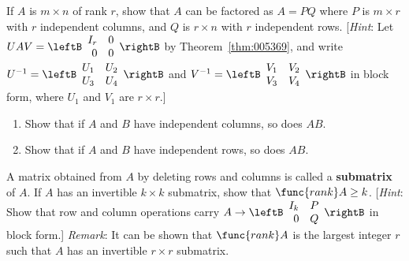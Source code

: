 \begin{multicols}{2}
\begin{ex}
If $A$ is $m \times n$ of rank $r$, show that $A$ can be factored as $A = PQ$ where $P$ is $m \times r$ with $r$ independent columns, and $Q$ is $r \times n$ with $r$ independent rows. [\textit{Hint}: Let 
$UAV = \leftB \begin{array}{rr}
I_r & 0 \\
0 & 0
\end{array} \rightB$ by Theorem~\ref{thm:005369}, and write $U^{-1} = \leftB \begin{array}{rr}
U_1 & U_2 \\
U_3 & U_4
\end{array} \rightB$ and $V^{-1} = \leftB \begin{array}{rr}
V_1 & V_2 \\
V_3 & V_4
\end{array} \rightB$ in block form, where $U_{1}$ and $V_{1}$ are $r \times r$.]
\end{ex}

\begin{ex}
\begin{enumerate}[label={\alph*.}]
\item Show that if $A$ and $B$ have independent columns, so does $AB$.

\item Show that if $A$ and $B$ have independent rows, so does $AB$.

\end{enumerate}
\end{ex}

\begin{ex}
A matrix obtained from $A$ by deleting rows and columns is called a \textbf{submatrix} of $A$. If $A$ has an invertible $k \times k$ submatrix, show that $\func{rank} A \geq k$. [\textit{Hint}: Show that row and column operations carry 
\newline $A \rightarrow
\leftB \begin{array}{rr}
I_k & P \\
0 & Q
\end{array} \rightB$ in block form.] \textit{Remark}: It can be shown that $\func{rank} A$ is the largest integer $r$ such that $A$ has an invertible $r \times r$ submatrix.
\end{ex}
\end{multicols}
